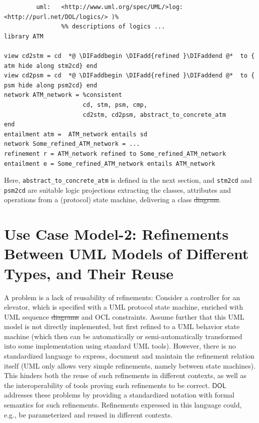 \documentclass[10pt,fleqn,final]{scrreprt}
\newcommand*{\DOL}{\ensuremath{\mathsf{DOL}}\xspace}
\providecommand{\DIFadd}[1]{{\protect\color{blue}\uwave{#1}}} %
\providecommand{\DIFdel}[1]{{\protect\color{red}\sout{#1}}}                      %
\providecommand{\DIFaddbegin}{} %
\providecommand{\DIFaddend}{} %
\providecommand{\DIFdelbegin}{} %
\providecommand{\DIFdelend}{} %
\begin{document}
\begin{lstlisting}[basicstyle=\ttfamily,language=dolText,escapechar=@,mathescape]
%prefix( :      <http://www.example.org/uml/>
         uml:   <http://www.uml.org/spec/UML/>log:   <http://purl.net/DOL/logics/> )%
                %% descriptions of logics ...
library ATM

view cd2stm = cd  *@ \DIFaddbegin \DIFadd{refined }\DIFaddend @*  to { atm hide along stm2cd} end
view cd2psm = cd  *@ \DIFaddbegin \DIFadd{refined }\DIFaddend @*  to { psm hide along psm2cd} end
network ATM_network = %consistent
                      cd, stm, psm, cmp,
                      cd2stm, cd2psm, abstract_to_concrete_atm
end
entailment atm =  ATM_network entails sd
network Some_refined_ATM_network = ...  
refinement r = ATM_network refined to Some_refined_ATM_network
entailment e = Some_refined_ATM_network entails ATM_network
\end{lstlisting}
Here, \texttt{abstract\_to\_concrete\_atm} is defined in the next
section, and \texttt{stm2cd} and \texttt{psm2cd} are suitable logic
projections extracting the classes, attributes and operations from a
(protocol) state machine, delivering a class \DIFdelbegin \DIFdel{diagram}\DIFdelend \DIFaddbegin \DIFadd{model}\DIFaddend .

\DIFdelbegin %
\DIFdelend \DIFaddbegin \section{Use Case Model-2: Refinements Between UML Models of Different Types, and Their Reuse}
\DIFaddend \label{model-2}

A problem is a lack of reusability of refinements: Consider a controller for an elevator, which is specified with a UML protocol state machine, enriched with UML 
sequence \DIFdelbegin \DIFdel{diagrams }\DIFdelend \DIFaddbegin \DIFadd{models }\DIFaddend and OCL constraints. Assume further that this UML model is not directly implemented, but first refined to a UML behavior state machine (which then 
can be automatically or semi-automatically transformed into some implementation using standard UML tools). However, there is no standardized language to 
express, document and maintain the refinement relation itself (UML only allows very simple refinements, namely between state machines). This hinders both the 
reuse of such refinements in different contexts, as well as the interoperability of tools proving such refinements to be correct. \DOL  
addresses these problems by providing a standardized notation with formal semantics for such refinements. Refinements expressed in this language could, e.g., be 
parameterized and reused in different contexts.
\end{document}
